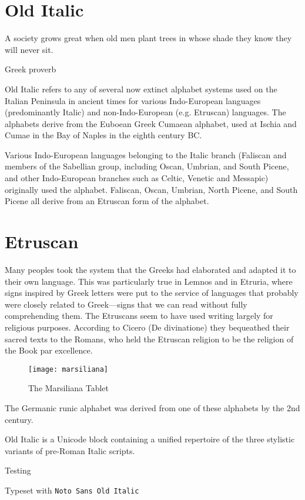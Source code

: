 \section{Old Italic}

\epigraph{A society grows great when old men plant
trees in whose shade they know they will never sit.}{Greek proverb}
\label{s:olditalic}
\newfontfamily{}


Old Italic refers to any of several now extinct alphabet systems used on the Italian Peninsula in ancient times for various Indo-European languages (predominantly Italic) and non-Indo-European (e.g. Etruscan) languages. The alphabets derive from the Euboean Greek Cumaean alphabet, used at Ischia and Cumae in the Bay of Naples in the eighth century BC.

Various Indo-European languages belonging to the Italic branch (Faliscan and members of the Sabellian group, including Oscan, Umbrian, and South Picene, and other Indo-European branches such as Celtic, Venetic and Messapic) originally used the alphabet. Faliscan, Oscan, Umbrian, North Picene, and South Picene all derive from an Etruscan form of the alphabet.

\section{Etruscan}

Many peoples took the system that the Greeks had elaborated and
adapted it to their own language. This was particularly true in Lemnos and
in Etruria, where signs inspired by Greek letters were put to the service of
languages that probably were closely related to Greek—signs that we can
read without fully comprehending them. The Etruscans seem to have used
writing largely for religious purposes. According to Cicero (De divinatione)
they bequeathed their sacred texts to the Romans, who held the Etruscan
religion to be the religion of the Book par excellence.\cite{henri1994}

\begin{figure}[htbp]
\centering
\texttt{[image: marsiliana]}
\caption{The Marsiliana Tablet}
\end{figure}

The Germanic runic alphabet was derived from one of these alphabets by the 2nd century.


Old Italic is a Unicode block containing a unified repertoire of the three stylistic variants of pre-Roman Italic scripts.

\begin{scriptexample}[]{Testing}

{\leavevmode
\hfill\hfill\hfill\footnotesize Typeset with \texttt{Noto Sans Old Italic~}
}
\end{scriptexample}